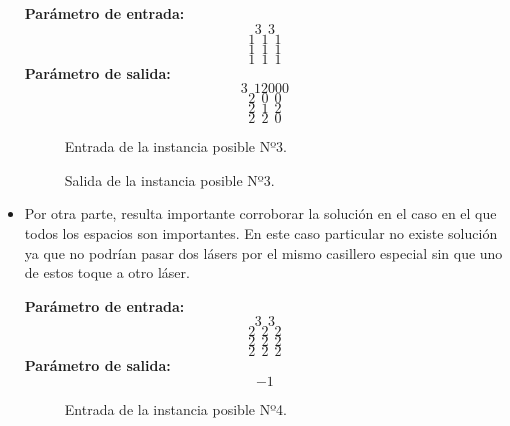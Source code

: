 \begin{itemize}
\textbf{Parámetro de entrada:} 
$$3\ \ 3$$
$$1\ \ 1\ \ 1$$
$$1\ \ 1\ \ 1$$
$$1\ \ 1\ \ 1$$
\textbf{Parámetro de salida:} 
$$3\ \ 12000$$
$$2\ \ 0\ \ 0$$
$$2\ \ 1\ \ 2$$
$$2\ \ 2\ \ 0$$
\newline

\begin{figure}[H] %
\hfill
\begin{minipage}[t]{.45\textwidth}
\begin{center}
\caption{Entrada de la instancia posible Nº3.}
\label{fig-tc1}
\end{center}
\end{minipage}
\hfill
\begin{minipage}[t]{.45\textwidth}
\begin{center}
\caption{Salida de la instancia posible Nº3.}
\label{fig-tc2}
\end{center}
\end{minipage}
\hfill
\end{figure}

\item Por otra parte, resulta importante corroborar la solución en el caso en el que todos los espacios son importantes. En este caso particular no existe solución ya que no podrían pasar dos lásers por el mismo casillero especial sin que uno de estos toque a otro láser.\newline

\textbf{Parámetro de entrada:} 
$$3\ \ 3$$
$$2\ \ 2\ \ 2$$
$$2\ \ 2\ \ 2$$
$$2\ \ 2\ \ 2$$
\textbf{Parámetro de salida:} $$-1$$\newline

\begin{center}
\begin{figure}[H] %
\begin{minipage}[t]{.45\textwidth}
\begin{center}
\caption{Entrada de la instancia posible Nº4.}
\end{center}
\label{fig-tc1}
\end{minipage}
\end{figure}
\end{center}


\end{itemize}

